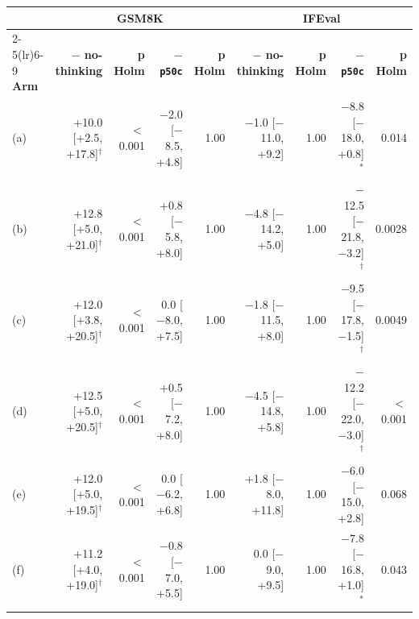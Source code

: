 \begin{tabular}{lrrrrrrrr}
\toprule
& \multicolumn{4}{c}{\textbf{GSM8K}} & \multicolumn{4}{c}{\textbf{IFEval}} \\
\cmidrule(lr){2-5}\cmidrule(lr){6-9}
\textbf{Arm} & \textbf{$-$ no-thinking} & \textbf{p Holm} & \textbf{$-$ \texttt{p50c}} & \textbf{p Holm} & \textbf{$-$ no-thinking} & \textbf{p Holm} & \textbf{$-$ \texttt{p50c}} & \textbf{p Holm} \\
\midrule
(a) & +10.0 [+2.5, +17.8]$^{\dagger}$ & $<$0.001 & $-$2.0 [$-$8.5, +4.8] & 1.00 & $-$1.0 [$-$11.0, +9.2] & 1.00 & $-$8.8 [$-$18.0, +0.8]$^{\ast}$ & 0.014 \\
(b) & +12.8 [+5.0, +21.0]$^{\dagger}$ & $<$0.001 & +0.8 [$-$5.8, +8.0] & 1.00 & $-$4.8 [$-$14.2, +5.0] & 1.00 & $-$12.5 [$-$21.8, $-$3.2]$^{\dagger}$ & 0.0028 \\
(c) & +12.0 [+3.8, +20.5]$^{\dagger}$ & $<$0.001 & 0.0 [$-$8.0, +7.5] & 1.00 & $-$1.8 [$-$11.5, +8.0] & 1.00 & $-$9.5 [$-$17.8, $-$1.5]$^{\dagger}$ & 0.0049 \\
(d) & +12.5 [+5.0, +20.5]$^{\dagger}$ & $<$0.001 & +0.5 [$-$7.2, +8.0] & 1.00 & $-$4.5 [$-$14.8, +5.8] & 1.00 & $-$12.2 [$-$22.0, $-$3.0]$^{\dagger}$ & $<$0.001 \\
(e) & +12.0 [+5.0, +19.5]$^{\dagger}$ & $<$0.001 & 0.0 [$-$6.2, +6.8] & 1.00 & +1.8 [$-$8.0, +11.8] & 1.00 & $-$6.0 [$-$15.0, +2.8] & 0.068 \\
(f) & +11.2 [+4.0, +19.0]$^{\dagger}$ & $<$0.001 & $-$0.8 [$-$7.0, +5.5] & 1.00 & 0.0 [$-$9.0, +9.5] & 1.00 & $-$7.8 [$-$16.8, +1.0]$^{\ast}$ & 0.043 \\
\bottomrule
\end{tabular}
